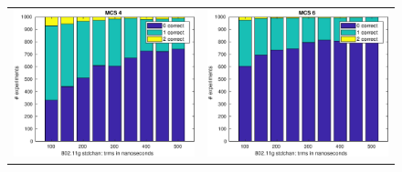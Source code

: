 \documentclass[accentcolor=tud8b,colorbacktitle]{tudbeamer}
\begin{document}
\begin{frame}
\begin{figure}[H]
\begin{tabular}{cc}
		\includegraphics[height=0.52\textheight]{../../gfx/plots/trms-mcs4} &
		\includegraphics[height=0.52\textheight]{../../gfx/plots/trms-mcs6} \\
	\end{tabular}
\end{figure}
\end{frame}
\end{document}
